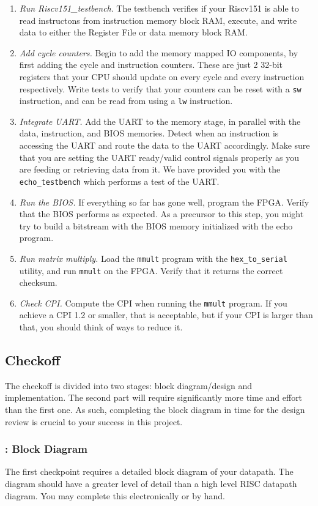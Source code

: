 \documentclass[11pt]{article}
\begin{document}
\begin{enumerate}
  \item \textit{Run Riscv151\_testbench}. The testbench verifies if your Riscv151 is able to read instructons from instruction memory block RAM, execute, and write data to either the Register File or data memory block RAM.
  \item \textit{Add cycle counters.} Begin to add the memory mapped IO components, by first adding the cycle and instruction counters. These are just 2 32-bit registers that your CPU should update on every cycle and every instruction respectively. Write tests to verify that your counters can be reset with a \verb|sw| instruction, and can be read from using a \verb|lw| instruction.
  \item \textit{Integrate UART.} Add the UART to the memory stage, in parallel with the data, instruction, and BIOS memories. Detect when an instruction is accessing the UART and route the data to the UART accordingly. Make sure that you are setting the UART ready/valid control signals properly as you are feeding or retrieving data from it. We have provided you with the \verb|echo_testbench| which performs a test of the UART.
  \item \textit{Run the BIOS.} If everything so far has gone well, program the FPGA. Verify that the BIOS performs as expected. As a precursor to this step, you might try to build a bitstream with the BIOS memory initialized with the echo program.
  \item \textit{Run matrix multiply.} Load the \verb|mmult| program with the \verb|hex_to_serial| utility, and run \verb|mmult| on the FPGA. Verify that it returns the correct checksum.
  \item \textit{Check CPI.} Compute the CPI when running the \verb|mmult| program. If you achieve a CPI 1.2 or smaller, that is acceptable, but if your CPI is larger than that, you should think of ways to reduce it.
\end{enumerate}

\subsection{Checkoff}
The checkoff is divided into two stages: block diagram/design and implementation.
The second part will require significantly more time and effort than the first one.
As such, completing the block diagram in time for the design review is crucial to your success in this project.

\subsubsection{\blockDiagramTaskName: Block Diagram}
The first checkpoint requires a detailed block diagram of your datapath.
The diagram should have a greater level of detail than a high level RISC datapath diagram.
You may complete this electronically or by hand.
\end{document}

